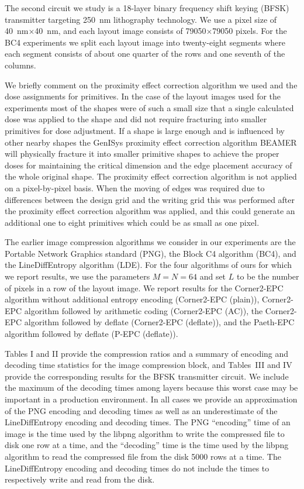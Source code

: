 \documentclass{article}
\begin{document}
The second circuit we study is a 18-layer binary frequency shift keying
(BFSK) transmitter targeting 250~nm lithography technology.
We use a pixel size of 40~nm$\times$40~nm, and each layout image consists of
79050$\times$79050 pixels.
For the BC4 experiments we split each layout image into twenty-eight segments
where each segment consists of about one quarter of the rows and
one seventh of the columns.

We briefly comment on the proximity effect correction algorithm we used
and the dose assignments for primitives. 
In the case of the layout images used for the experiments most of the shapes 
were of such a small size that a single calculated dose was applied to the 
shape and did not require fracturing into smaller primitives for dose 
adjustment.  If a shape is large enough and is influenced by other nearby 
shapes the GenISys proximity effect correction algorithm {\small BEAMER}
will physically fracture it into smaller primitive shapes to achieve the 
proper doses for maintaining the critical dimension and the edge placement 
accuracy of the whole original shape.  The proximity effect correction
algorithm is not applied on a pixel-by-pixel basis.  When the moving of 
edges was required due to differences between the design grid and the writing 
grid this was performed after the proximity effect correction algorithm was 
applied, and this could generate an additional one to eight primitives which 
could be as small as one pixel.

The earlier image compression algorithms we consider in our experiments are
the Portable Network Graphics standard (PNG),
the Block C4 algorithm (BC4), and
the LineDiffEntropy algorithm (LDE).
For the four algorithms of ours for which we report results, we 
use the parameters $M=N=64$ and set $L$ to be the number of pixels in a row of
the layout image.
We report results for
the Corner2-EPC algorithm without additional entropy encoding
(Corner2-EPC (plain)),
Corner2-EPC algorithm followed by arithmetic coding 
(Corner2-EPC (AC)),
the Corner2-EPC algorithm followed by deflate (Corner2-EPC (deflate)), and
the Paeth-EPC algorithm followed by deflate (P-EPC (deflate)).

Tables I and II provide the compression ratios and a summary of 
encoding and decoding time statistics for the image compression block,
and Tables~III and IV
provide the corresponding results for the BFSK transmitter circuit.
We include the maximum of the decoding times among layers because this worst 
case may be important in a production environment.
In all cases we provide an approximation of the PNG encoding and decoding 
times as well as an underestimate of
the LineDiffEntropy encoding and decoding times.  The PNG ``encoding'' time 
of an image is the time used by the libpng algorithm to write the 
compressed file to disk one row at a time, and the ``decoding'' time is the 
time used by the libpng algorithm to read the compressed file from the disk
5000 rows at a time.  The LineDiffEntropy
encoding and decoding times do not include the times to respectively write
and read from the disk.
\end{document}
